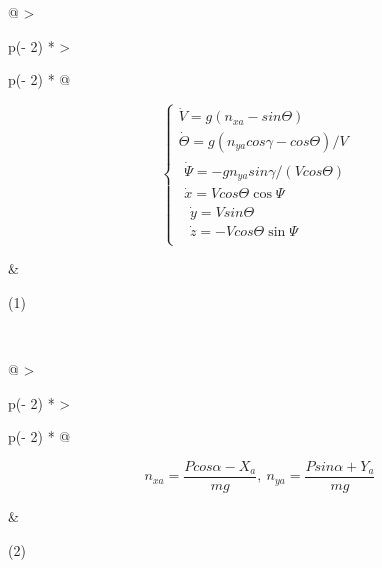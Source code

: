\begin{longtable}[]{@{}
  >{\raggedright\arraybackslash}p{(\columnwidth - 2\tabcolsep) * }
  >{\raggedright\arraybackslash}p{(\columnwidth - 2\tabcolsep) * }@{}}
\begin{minipage}[b]{\linewidth}\raggedright
\[\left\{ \begin{matrix}
\dot{V} = g(n_{xa} - sin\Theta) \\
\dot{\Theta} = g(n_{ya}cos\gamma - cos\Theta)/V \\
\begin{matrix}
\dot{\Psi} = - gn_{ya}sin\gamma/(Vcos\Theta) \\
\dot{x} = Vcos\Theta\cos\Psi \\
\begin{matrix}
\dot{y} = Vsin\Theta \\
\dot{z} = - Vcos\Theta\sin\Psi
\end{matrix}
\end{matrix}
\end{matrix} \right.\ \]
\end{minipage} & \begin{minipage}[b]{\linewidth}\raggedright
(1)
\end{minipage} \\
\end{longtable}

\begin{longtable}[]{@{}
  >{\raggedright\arraybackslash}p{(\columnwidth - 2\tabcolsep) * }
  >{\raggedright\arraybackslash}p{(\columnwidth - 2\tabcolsep) * }@{}}

\begin{minipage}[b]{\linewidth}\raggedright
\[n_{xa} = \frac{Pcos\alpha - X_{a}}{mg},\ n_{ya} = \frac{Psin\alpha + Y_{a}}{mg}\]
\end{minipage} & \begin{minipage}[b]{\linewidth}\raggedright
(2)
\end{minipage} \\
\end{longtable}

